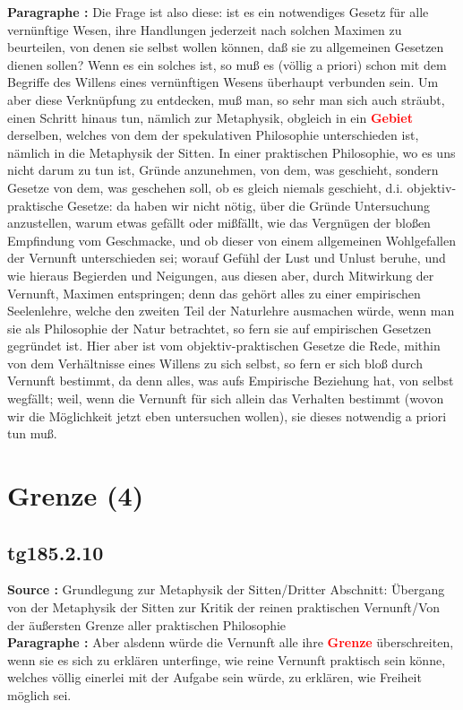 \documentclass[a4paper,12pt,twoside]{book}
\newcommand{\match}[1]{\textcolor{red}{\textbf{#1}}}
\newcommand{\unnumberedsection}[1]{
	\section*{#1}
	\addcontentsline{toc}{section}{#1}
	\markright{#1}
}
\begin{document}
	\noindent\textbf{Paragraphe : }Die Frage ist also diese: ist es ein notwendiges Gesetz für alle vernünftige Wesen, ihre Handlungen jederzeit nach solchen Maximen zu beurteilen, von denen sie selbst wollen können, daß sie zu allgemeinen Gesetzen dienen sollen? Wenn es ein solches ist, so muß es (völlig a priori) schon mit dem Begriffe des Willens eines vernünftigen Wesens überhaupt verbunden sein. Um aber diese Verknüpfung zu entdecken, muß man, so sehr man sich auch sträubt, einen Schritt hinaus tun, nämlich zur Metaphysik, obgleich in ein \match{Gebiet} derselben, welches von dem der spekulativen Philosophie unterschieden ist, nämlich in die Metaphysik der Sitten. In einer praktischen Philosophie, wo es uns nicht darum zu tun ist, Gründe anzunehmen, von dem, was geschieht, sondern Gesetze von dem, was geschehen soll, ob es gleich niemals geschieht, d.i. objektiv-praktische Gesetze: da haben wir nicht nötig, über die Gründe Untersuchung anzustellen, warum etwas gefällt oder mißfällt, wie das Vergnügen der bloßen Empfindung vom Geschmacke, und ob dieser von einem allgemeinen Wohlgefallen der Vernunft unterschieden sei; worauf Gefühl der Lust und Unlust beruhe, und wie hieraus Begierden und Neigungen, aus diesen aber, durch Mitwirkung der Vernunft, Maximen entspringen; denn das gehört alles zu einer empirischen Seelenlehre, welche den zweiten Teil der Naturlehre ausmachen würde, wenn man sie als Philosophie der Natur betrachtet, so fern sie auf empirischen Gesetzen gegründet ist. Hier aber ist vom objektiv-praktischen Gesetze die Rede, mithin von dem Verhältnisse eines Willens zu sich selbst, so fern er sich bloß durch Vernunft bestimmt, da denn alles, was aufs  Empirische Beziehung hat, von selbst wegfällt; weil, wenn die Vernunft für sich allein das Verhalten bestimmt (wovon wir die Möglichkeit jetzt eben untersuchen wollen), sie dieses notwendig a priori tun muß. 
	
	\unnumberedsection{Grenze (4)} 
	\subsection*{tg185.2.10} 
	\textbf{Source : }Grundlegung zur Metaphysik der Sitten/Dritter Abschnitt: Übergang von der Metaphysik der Sitten zur Kritik der reinen praktischen Vernunft/Von der äußersten Grenze aller praktischen Philosophie\\  
	
	\noindent\textbf{Paragraphe : }Aber alsdenn würde die Vernunft alle ihre \match{Grenze} überschreiten, wenn sie es sich zu erklären unterfinge, wie reine Vernunft praktisch sein könne, welches völlig einerlei mit der Aufgabe sein würde, zu erklären, wie Freiheit möglich sei.
	
\end{document}
